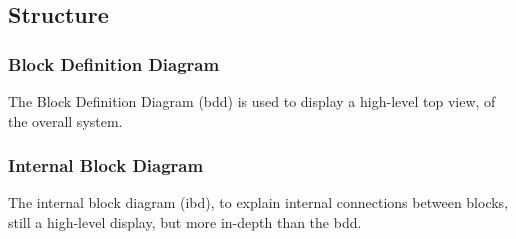 \subsection{Structure}\label{sc:structure}

\blindtext %

\subsubsection{Block Definition Diagram}\label{ssc:blockdefinitiondiagram}
The Block Definition Diagram (bdd) is used to display a high-level top view, of the overall system.


\subsubsection{Internal Block Diagram}\label{ssc:internalblockdiagram}
The internal block diagram (ibd), to explain internal connections between blocks, still a high-level display, but more in-depth than the bdd.